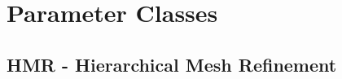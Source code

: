 \documentclass{scrartcl}
\begin{document}
\section{Parameter Classes}
\subsection{HMR - Hierarchical Mesh Refinement}


\printindex
\end{document}
